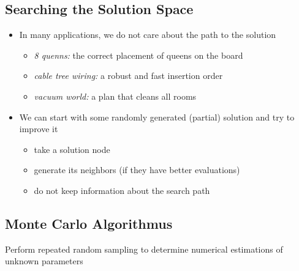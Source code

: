 \documentclass[conference]{styles/acmsiggraph}
\begin{document}
    \subsection{Searching the Solution Space}
        \begin{itemize}
            \item In many applications, we do not care about the path to the solution
                \begin{itemize}
                    \item \textit{8 quenns:} the correct placement of queens on the board
                    \item \textit{cable tree wiring:} a robust and fast insertion order
                    \item \textit{vacuum world:} a plan that cleans all rooms
                \end{itemize}
            \item We can start with some randomly generated (partial) solution and try to improve it
                \begin{itemize}
                    \item take a solution node
                    \item generate its neighbors (if they have better evaluations)
                    \item do not keep information about the search path
                \end{itemize}
        \end{itemize}
    
    
    
    
    
    
    \subsection{Monte Carlo Algorithmus}
        Perform repeated random sampling to determine numerical estimations of unknown parameters
    
\end{document}

